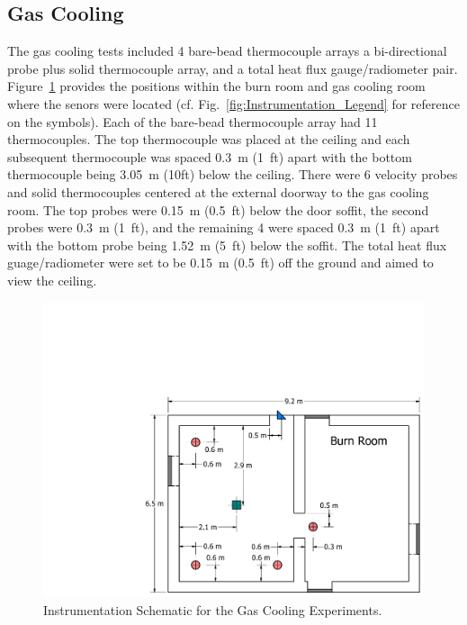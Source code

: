 \documentclass[12pt,oneside]{book}
\begin{document}
\subsection{Gas Cooling}
\label{subsec:Gas_Cooling_Instrumentation}

The gas cooling tests included 4 bare-bead thermocouple arrays  a bi-directional probe plus solid thermocouple array, and a total heat flux gauge/radiometer pair. Figure~\ref{fig:Gas_Cooling_Instrumentation_Dimensions} provides the positions within the burn room and gas cooling room where the senors were located (cf. Fig.~\ref{fig:Instrumentation_Legend} for reference on the symbols). Each of the bare-bead thermocouple array had 11 thermocouples. The top thermocouple was placed at the ceiling and each subsequent thermocouple was spaced 0.3~m (1~ft) apart with the bottom thermocouple being 3.05~m (10ft) below the ceiling. There were 6 velocity probes and solid thermocouples centered at the external doorway to the gas cooling room. The top probes were 0.15~m (0.5~ft) below the door soffit, the second probes were 0.3~m (1~ft), and the remaining 4 were spaced 0.3~m (1~ft) apart with the bottom probe being 1.52~m (5~ft) below the soffit. The total heat flux guage/radiometer were set to be 0.15~m (0.5~ft) off the ground and aimed to view the ceiling.

\begin{figure}[!ht]
	\includegraphics[width=\columnwidth]{../Figures/Floor_Plans/PDFs/West_Structure/DelCo_2012_West_Structure_Instrumentation}
	\caption{Instrumentation Schematic for the Gas Cooling Experiments.}
	\label{fig:Gas_Cooling_Instrumentation_Dimensions}
\end{figure}
\end{document}
